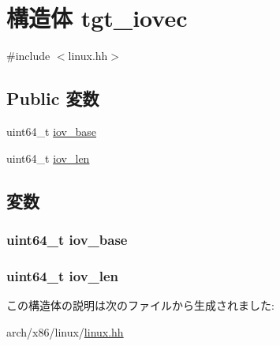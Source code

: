 \hypertarget{structX86Linux64_1_1tgt__iovec}{
\section{構造体 tgt\_\-iovec}
\label{structX86Linux64_1_1tgt__iovec}
}


{\ttfamily \#include $<$linux.hh$>$}\subsection*{Public 変数}
\begin{DoxyCompactItemize}
\item 
uint64\_\-t \hyperlink{structX86Linux64_1_1tgt__iovec_ac59b8387398fca5cb863b59eb13a8363}{iov\_\-base}
\item 
uint64\_\-t \hyperlink{structX86Linux64_1_1tgt__iovec_a530d392bf52a29de04bb57ffd97bef5d}{iov\_\-len}
\end{DoxyCompactItemize}


\subsection{変数}
\hypertarget{structX86Linux64_1_1tgt__iovec_ac59b8387398fca5cb863b59eb13a8363}{
\subsubsection[{iov\_\-base}]{\setlength{\rightskip}{0pt plus 5cm}uint64\_\-t {\bf iov\_\-base}}}
\label{structX86Linux64_1_1tgt__iovec_ac59b8387398fca5cb863b59eb13a8363}
\hypertarget{structX86Linux64_1_1tgt__iovec_a530d392bf52a29de04bb57ffd97bef5d}{
\subsubsection[{iov\_\-len}]{\setlength{\rightskip}{0pt plus 5cm}uint64\_\-t {\bf iov\_\-len}}}
\label{structX86Linux64_1_1tgt__iovec_a530d392bf52a29de04bb57ffd97bef5d}


この構造体の説明は次のファイルから生成されました:\begin{DoxyCompactItemize}
\item 
arch/x86/linux/\hyperlink{arch_2x86_2linux_2linux_8hh}{linux.hh}\end{DoxyCompactItemize}
